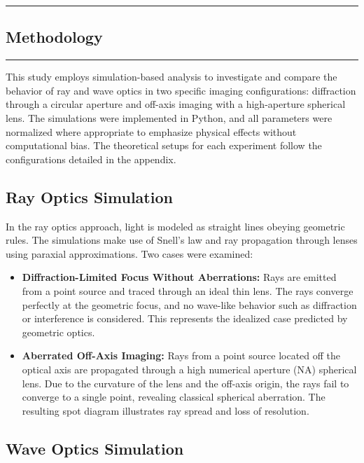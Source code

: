 {\color{gray}\hrule}
\begin{center}
\section{Methodology}
\bigskip
\end{center}
{\color{gray}\hrule}
\begin{multicols}{2}
This study employs simulation-based analysis to investigate and compare the behavior of ray and wave optics in two specific imaging configurations: diffraction through a circular aperture and off-axis imaging with a high-aperture spherical lens. 
The simulations were implemented in Python, and all parameters were normalized where appropriate to emphasize physical
 effects without computational bias. The theoretical setups for each experiment follow the configurations detailed in the appendix.

\subsection{Ray Optics Simulation}

In the ray optics approach, light is modeled as straight lines obeying geometric rules. 
The simulations make use of Snell's law and ray propagation through lenses using paraxial approximations. 
Two cases were examined:

\begin{itemize}
\item \textbf{Diffraction-Limited Focus Without Aberrations:} Rays are emitted from a point source and traced through an ideal thin lens. 
The rays converge perfectly at the geometric focus, and no wave-like behavior such as diffraction or interference 
is considered. This represents the idealized case predicted by geometric optics.

\item \textbf{Aberrated Off-Axis Imaging:} Rays from a point source located off the optical axis are propagated
through a high numerical aperture (NA) spherical lens. Due to the curvature of the lens and the off-axis origin, 
the rays fail to converge to a single point, revealing classical spherical aberration. The resulting spot diagram 
illustrates ray spread and loss of resolution.
\end{itemize}

\subsection{Wave Optics Simulation}


\end{multicols}
